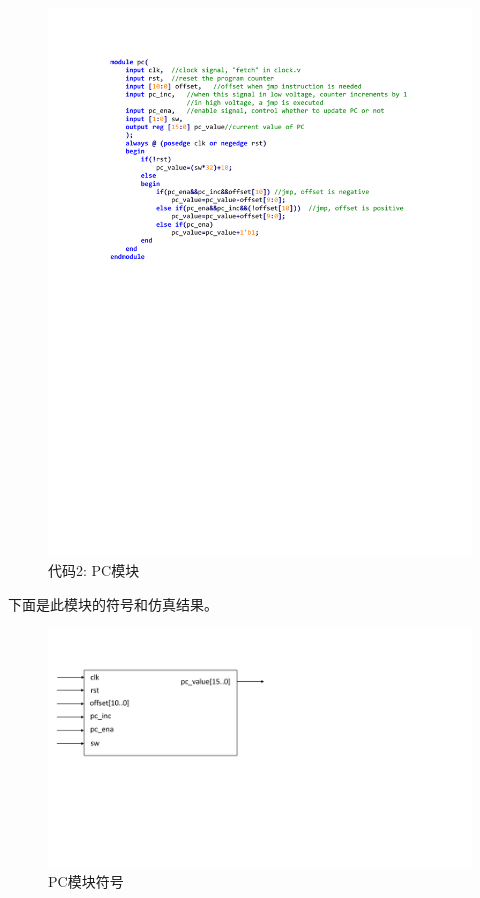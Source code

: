 \documentclass[titlepage, 11pt]{article}
\begin{document}
		\begin{figure}[H]
			\centering
			\includegraphics[scale=1]{16.pdf}
			\caption*{代码2: PC模块}
		\end{figure}
		\par 下面是此模块的符号和仿真结果。
		\begin{figure}[H] 
				\centering
				\includegraphics[scale=0.5]{17.pdf}  
				\caption{PC模块符号}
		\end{figure} 
\end{document}
